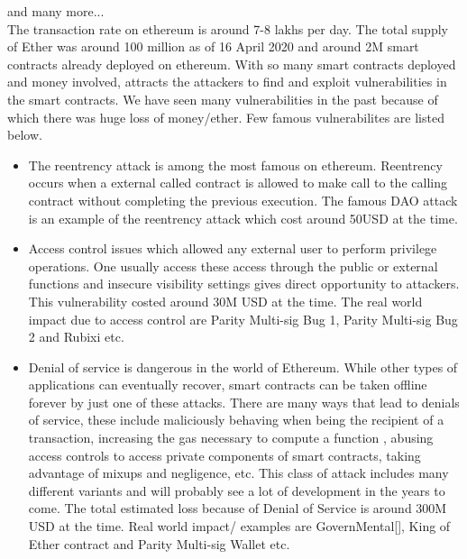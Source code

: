 \documentclass{article}
\begin{document}
and many more...\\

The transaction rate on ethereum is around 7-8 lakhs per day. The total supply of Ether was around 100 million as of 16 April 2020 and around 2M smart contracts already deployed on ethereum. With so many smart contracts deployed and money involved, attracts the attackers to find and exploit vulnerabilities in the smart contracts. We have seen many vulnerabilities in the past because of which there was huge loss of money/ether. Few famous vulnerabilites are listed below.
\begin{itemize}
    \item The reentrency attack is among the most famous on ethereum. Reentrency occurs when a external called contract is allowed to make call to the calling contract without completing the previous execution. The famous DAO attack is an example of the reentrency attack which cost around 50USD at the time.
    \item Access control issues which allowed any external user to perform privilege operations. One usually access these access through the public or external functions and insecure visibility settings gives direct opportunity to attackers. This vulnerability costed around 30M USD at the time. The real world impact due to access control are Parity Multi-sig Bug 1, Parity Multi-sig Bug 2 and Rubixi etc.
    \item Denial of service is dangerous in the world of Ethereum. While other types of applications can eventually recover, smart contracts can be taken offline forever by just one of these attacks. There are many ways that lead to denials of service, these include maliciously behaving when being the recipient of a transaction, increasing the gas necessary to compute a function , abusing access controls to access private components of smart contracts, taking advantage of mixups and negligence, etc. This class of attack includes many different variants and will probably see a lot of development in the years to come. The total estimated loss because of Denial of Service is around 300M USD at the time. Real world impact/ examples are GovernMental[], King of Ether contract and Parity Multi-sig Wallet etc.
\end{itemize}  
\end{document}

